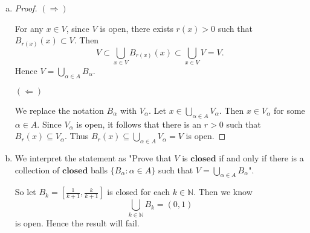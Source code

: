 \begin{Exercise}
\begin{enumerate}[a)]
\item
\begin{proof}
$(\Longrightarrow)$

For any $x\in V$, since $V$ is open, there exists $r(x)>0$ such that $B_{r(x)}(x)\subset V$. Then $$V\subset \bigcup_{x\in V}B_{r(x)}(x)\subset \bigcup_{x\in V}V = V.$$
Hence $V=\bigcup_{\alpha\in A}B_{\alpha}$.

\vspace{2ex}

$(\Longleftarrow)$

We replace the notation $B_{\alpha}$ with $V_{\alpha}$. Let $x\in\bigcup_{\alpha\in A} V_{\alpha}$. Then $x\in V_{\alpha}$ for some $\alpha\in A$. Since $V_{\alpha}$ is open, it follows that there is an $r>0$ such that $B_{r}(x)\subseteq V_{\alpha}$. Thus $B_r(x)\subseteq \bigcup_{\alpha\in A}V_{\alpha} = V$ is open. 
\end{proof}

\item
\begin{solution}
We interpret the statement as "Prove that $V$ is $\mathbf{closed}$ if and only if there is a collection of $\mathbf{closed}$ balls $\{B_{\alpha}:\alpha\in A\}$ such that $V=\bigcup_{\alpha\in A}B_{\alpha}$".

So let $B_k = [\frac{1}{k+1}, \frac{k}{k+1}]$ is closed for each $k\in\mathbb{N}$. Then we know $$\bigcup_{k\in\mathbb{N}}B_k = (0, 1)$$ is open. Hence the result will fail.
\end{solution}
\end{enumerate}
\end{Exercise}